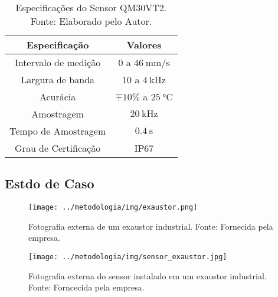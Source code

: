 \documentclass[a4paper]{ifacconf}
\begin{document}
\begin{table}[h!]
  \caption{Especificações do Sensor QM30VT2. Fonte: Elaborado pelo Autor.}
  \label{tab:espec_sensor}
  \centering
  \begin{minipage}{.33\textwidth}
    \begin{tabular*}{\textwidth}{c|c}
      \hline
      Especificação            & Valores                                     \\ \hline
      \hline
      Intervalo de medição     &  0 a $\SI{46}{\milli\metre\per\second}$     \\
      Largura de banda         &  10 a $\SI{4}{\kilo\hertz}$                 \\ 
      Acurácia                 &  $\mp 10 \%$ a $\SI{25}{\celsius}$          \\
      Amostragem               &  $\SI{20}{\kilo\hertz}$                     \\
      Tempo de Amostragem      &  $\SI{0.4}{\second}$                        \\
      Grau de Certificação     &  IP67                                       \\ \hline
    \end{tabular*}
  \end{minipage}
\end{table}


\subsection{Estdo de Caso}


\begin{figure}[h!]
  \begin{center}
      \texttt{[image: ../metodologia/img/exaustor.png]}
  \end{center}
  \caption{Fotografia externa de um exaustor industrial. Fonte: Fornecida pela empresa.}
  \label{fig:exautor}
\end{figure}

\begin{figure}[h!]
  \begin{center}
      \texttt{[image: ../metodologia/img/sensor\_exaustor.jpg]}
  \end{center}
  \caption{Fotografia externa do sensor instalado em um exaustor industrial. Fonte: Forncecida pela empresa.}
  \label{fig:sensor_exaustor}
\end{figure}

\end{document}
